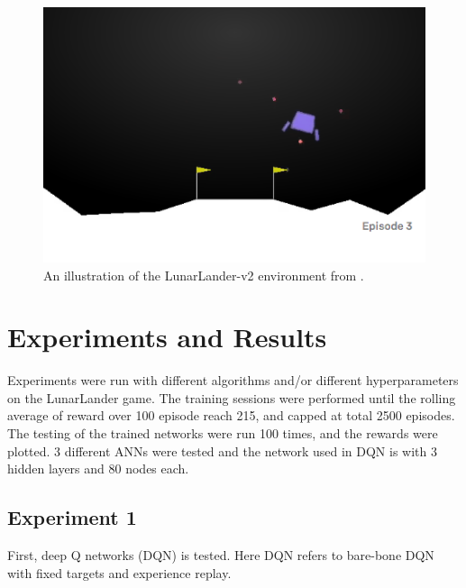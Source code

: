 \documentclass[10pt]{article}
\begin{document}
\begin{figure}[h!]
  \centering
  \includegraphics[width=0.45\linewidth]{illustration.png}
    \caption{An illustration of the LunarLander-v2 environment from .}
  \label{fig:lunarlander}
\end{figure}


\section{Experiments and Results} \label{experiments}
Experiments were run with different algorithms and/or different hyperparameters on the LunarLander game. The training sessions were performed until the rolling average of reward over 100 episode reach 215, and capped at total 2500 episodes. The testing of the trained networks were run 100 times, and the rewards were plotted. 3 different ANNs were tested and the network used in DQN is with 3 hidden layers and 80 nodes each.

\par




\subsection{Experiment 1} \label{experiment1}
First, deep Q networks (DQN) is tested. Here DQN refers to bare-bone DQN with fixed targets and experience replay.\cite{MnihPlayingAtariDeep2013, RoderickImplementingDeepQNetwork2017} \par
\noindent
\end{document}
